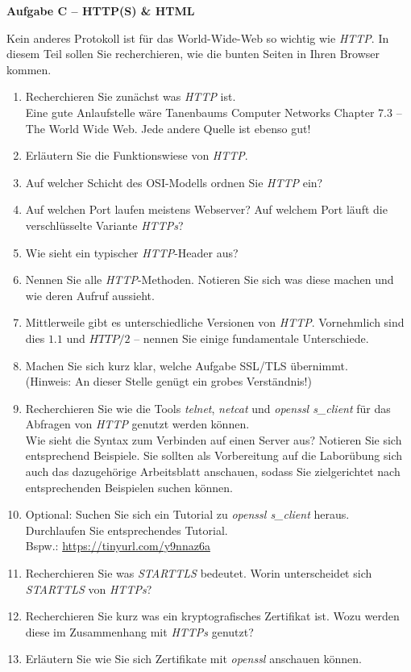 \documentclass[paper=a4,fontsize=11pt]{scrartcl}%
\numberwithin{equation}{section}
\begin{document}
\begin{center}\Large{\textbf{Aufgabe C -- HTTP(S) \& HTML}}\end{center}\vskip0.2in
Kein anderes Protokoll ist für das World-Wide-Web so wichtig wie \emph{HTTP}. In diesem Teil sollen Sie recherchieren, wie die bunten Seiten in Ihren Browser kommen.
\begin{enumerate}
	\item Recherchieren Sie zunächst was \emph{HTTP} ist.\\
	Eine gute Anlaufstelle wäre Tanenbaums Computer Networks Chapter 7.3 -- The World Wide Web. Jede andere Quelle ist ebenso gut!
	\item Erläutern Sie die Funktionswiese von \emph{HTTP}.
	\item Auf welcher Schicht des OSI-Modells ordnen Sie \emph{HTTP} ein?
	\item Auf welchen Port laufen meistens Webserver? Auf welchem Port läuft die verschlüsselte Variante \emph{HTTPs}?
	\item Wie sieht ein typischer \emph{HTTP}-Header aus?
	\item Nennen Sie alle \emph{HTTP}-Methoden. Notieren Sie sich was diese machen und wie deren Aufruf aussieht.
	\item Mittlerweile gibt es unterschiedliche Versionen von \emph{HTTP}. Vornehmlich sind dies $1.1$ und $HTTP/2$ -- nennen Sie einige fundamentale Unterschiede.
	\item Machen Sie sich kurz klar, welche Aufgabe SSL/TLS übernimmt.\\
	(Hinweis: An dieser Stelle genügt ein grobes Verständnis!)
	\item Recherchieren Sie wie die Tools \emph{telnet}, \emph{netcat} und \emph{openssl s\_client} für das Abfragen von \emph{HTTP} genutzt werden können.\\
	Wie sieht die Syntax zum Verbinden auf einen Server aus? Notieren Sie sich entsprechend Beispiele. Sie sollten als Vorbereitung auf die Laborübung sich auch das dazugehörige Arbeitsblatt anschauen, sodass Sie zielgerichtet nach entsprechenden Beispielen suchen können.
	\item Optional: Suchen Sie sich ein Tutorial zu \emph{openssl s\_client} heraus. Durchlaufen Sie entsprechendes Tutorial. \\
	Bspw.: \url{https://tinyurl.com/y9nnaz6a}
	\item Recherchieren Sie was \emph{STARTTLS} bedeutet. Worin unterscheidet sich \emph{STARTTLS} von \emph{HTTPs}?
	\item Recherchieren Sie kurz was ein kryptografisches Zertifikat ist. Wozu werden diese im Zusammenhang mit \emph{HTTPs} genutzt?
	\item Erläutern Sie wie Sie sich Zertifikate mit \emph{openssl} anschauen können.  
\end{enumerate}
\end{document}
